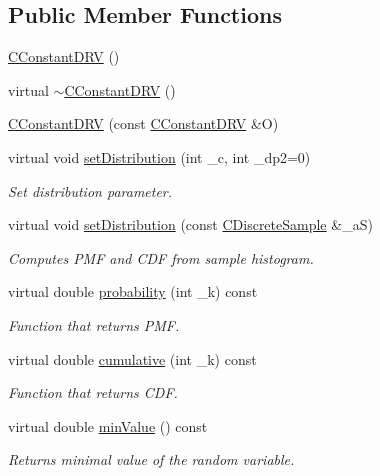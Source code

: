 \subsection*{Public Member Functions}
\begin{DoxyCompactItemize}
\item 
\hyperlink{class_c_constant_d_r_v_a0c3499451fe54b1a42c6a26474c344aa}{C\-Constant\-D\-R\-V} ()
\item 
virtual \hyperlink{class_c_constant_d_r_v_a1f600cdc9a090e01266c29b19896e5af}{$\sim$\-C\-Constant\-D\-R\-V} ()
\item 
\hyperlink{class_c_constant_d_r_v_a9404234b2ec170d0b8195c11b7bd48ab}{C\-Constant\-D\-R\-V} (const \hyperlink{class_c_constant_d_r_v}{C\-Constant\-D\-R\-V} \&O)
\item 
virtual void \hyperlink{class_c_constant_d_r_v_a524e6add6b635ea92fe7d67ef3c56043}{set\-Distribution} (int \-\_\-c, int \-\_\-dp2=0)
\begin{DoxyCompactList}\small\item\em Set distribution parameter. \end{DoxyCompactList}\item 
virtual void \hyperlink{class_c_constant_d_r_v_a2f5dec9082ba7b2c6174df6c1d04917e}{set\-Distribution} (const \hyperlink{class_c_discrete_sample}{C\-Discrete\-Sample} \&\-\_\-a\-S)
\begin{DoxyCompactList}\small\item\em Computes P\-M\-F and C\-D\-F from sample histogram. \end{DoxyCompactList}\item 
virtual double \hyperlink{class_c_constant_d_r_v_a15e7dab1acdb0e1fb7eb6031e5ca1beb}{probability} (int \-\_\-k) const 
\begin{DoxyCompactList}\small\item\em Function that returns P\-M\-F. \end{DoxyCompactList}\item 
virtual double \hyperlink{class_c_constant_d_r_v_a3ff0806ce1d6875bcce0382222a7b564}{cumulative} (int \-\_\-k) const 
\begin{DoxyCompactList}\small\item\em Function that returns C\-D\-F. \end{DoxyCompactList}\item 
virtual double \hyperlink{class_c_constant_d_r_v_a85930e45d6e50977773fd963f88f2f44}{min\-Value} () const 
\begin{DoxyCompactList}\small\item\em Returns minimal value of the random variable. \end{DoxyCompactList}\item 

\end{DoxyCompactItemize}

